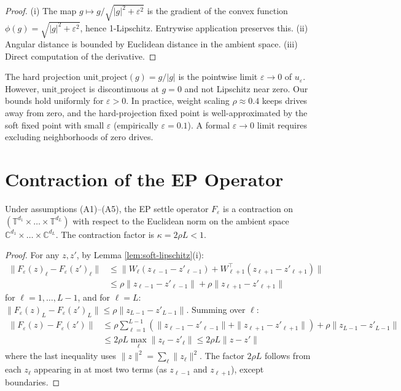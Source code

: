 \documentclass[11pt]{article}
\newcommand{\C}{\mathbb{C}}
\newcommand{\T}{\mathbb{T}}
\newcommand{\unitproject}{\mathrm{unit\_project}}
\begin{document}
\begin{proof}
(i) The map $g \mapsto g/\sqrt{|g|^2+\varepsilon^2}$ is the gradient of
the convex function $\phi(g) = \sqrt{|g|^2+\varepsilon^2}$, hence
1-Lipschitz. Entrywise application preserves this.
(ii) Angular distance is bounded by Euclidean distance in the ambient
space. (iii) Direct computation of the derivative.
\end{proof}

\begin{remark}
The hard projection $\unitproject(g) = g/|g|$ is the pointwise limit
$\varepsilon \to 0$ of $u_\varepsilon$. However, $\unitproject$ is
discontinuous at $g=0$ and not Lipschitz near zero. Our bounds hold
uniformly for $\varepsilon > 0$. In practice, weight scaling $\rho
\approx 0.4$ keeps drives away from zero, and the hard-projection
fixed point is well-approximated by the soft fixed point with small
$\varepsilon$ (empirically $\varepsilon=0.1$). A formal $\varepsilon
\to 0$ limit requires excluding neighborhoods of zero drives.
\end{remark}

\section{Contraction of the EP Operator}

\begin{lemma}
\label{lem:contraction}
Under assumptions (A1)--(A5), the EP settle operator $F_\varepsilon$
is a contraction on $(\T^{d_1} \times \dots \times \T^{d_L})$ with
respect to the Euclidean norm on the ambient space $\C^{d_1} \times
\dots \times \C^{d_L}$. The contraction factor is
$\kappa = 2\rho L < 1$.
\end{lemma}

\begin{proof}
For any $z, z'$, by Lemma \ref{lem:soft-lipschitz}(i):
\begin{align}
  \|F_\varepsilon(z)_\ell - F_\varepsilon(z')_\ell\|
  &\le \|W_\ell(z_{\ell-1}-z'_{\ell-1})
    + W_{\ell+1}^\top(z_{\ell+1}-z'_{\ell+1})\| \\
  &\le \rho \|z_{\ell-1}-z'_{\ell-1}\| + \rho \|z_{\ell+1}-z'_{\ell+1}\|
\end{align}
for $\ell=1,\dots,L-1$, and for $\ell=L$:
$\|F_\varepsilon(z)_L - F_\varepsilon(z')_L\| \le \rho \|z_{L-1}-z'_{L-1}\|$.
Summing over $\ell$:
\begin{align}
  \|F_\varepsilon(z) - F_\varepsilon(z')\|
  &\le \rho \sum_{\ell=1}^{L-1} (\|z_{\ell-1}-z'_{\ell-1}\|
    + \|z_{\ell+1}-z'_{\ell+1}\|) + \rho \|z_{L-1}-z'_{L-1}\| \\
  &\le 2\rho L \max_\ell \|z_\ell - z'_\ell\| \le 2\rho L \|z - z'\|
\end{align}
where the last inequality uses $\|z\|^2 = \sum_\ell \|z_\ell\|^2$.
The factor $2\rho L$ follows from each $z_\ell$ appearing in at most
two terms (as $z_{\ell-1}$ and $z_{\ell+1}$), except boundaries.
\end{proof}
\end{document}
